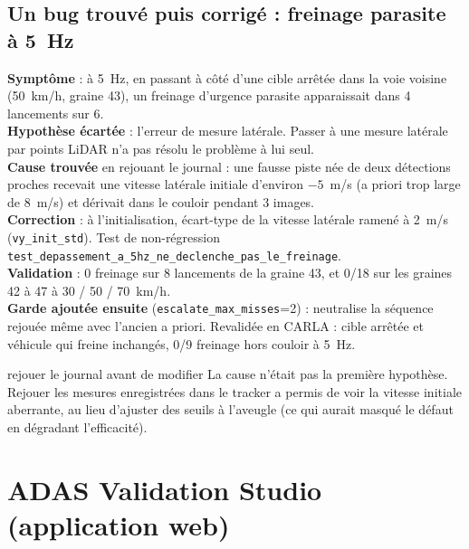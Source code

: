 \documentclass[11pt,a4paper]{article}
\newcommand{\code}[1]{\texttt{#1}}
\begin{document}
\subsection{Un bug trouv\'e puis corrig\'e : freinage parasite \`a 5~Hz}\label{sec:bug5hz}
\textbf{Sympt\^ome} : \`a 5~Hz, en passant \`a c\^ot\'e d'une cible arr\^et\'ee dans la voie voisine (50~km/h, graine 43), un freinage d'urgence parasite apparaissait dans 4 lancements sur 6.\\
\textbf{Hypoth\`ese \'ecart\'ee} : l'erreur de mesure lat\'erale. Passer \`a une mesure lat\'erale par points LiDAR n'a pas r\'esolu le probl\`eme \`a lui seul.\\
\textbf{Cause trouv\'ee} en rejouant le journal : une fausse piste n\'ee de deux d\'etections proches recevait une vitesse lat\'erale initiale d'environ $-5$~m/s (a priori trop large de 8~m/s) et d\'erivait dans le couloir pendant 3 images.\\
\textbf{Correction} : \`a l'initialisation, \'ecart-type de la vitesse lat\'erale ramen\'e \`a 2~m/s (\code{vy\_init\_std}). Test de non-r\'egression \code{test\_depassement\_a\_5hz\_ne\_declenche\_pas\_le\_freinage}.\\
\textbf{Validation} : 0 freinage sur 8 lancements de la graine 43, et 0/18 sur les graines 42 \`a 47 \`a 30 / 50 / 70~km/h.\\
\textbf{Garde ajout\'ee ensuite} (\code{escalate\_max\_misses}=2) : neutralise la s\'equence rejou\'ee m\^eme avec l'ancien a priori. Revalid\'ee en CARLA : cible arr\^et\'ee et v\'ehicule qui freine inchang\'es, 0/9 freinage hors couloir \`a 5~Hz.

\begin{choix}{rejouer le journal avant de modifier}
La cause n'\'etait pas la premi\`ere hypoth\`ese. Rejouer les mesures enregistr\'ees dans le tracker a permis de voir la vitesse initiale aberrante, au lieu d'ajuster des seuils \`a l'aveugle
(ce qui aurait masqu\'e le d\'efaut en d\'egradant l'efficacit\'e).
\end{choix}

\section{ADAS Validation Studio (application web)}
\end{document}
